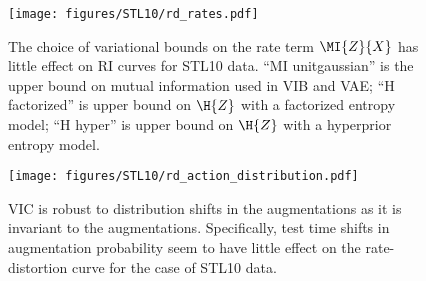 \documentclass[final]{article}
\begin{document}
\begin{figure}[!htb]
    \centering
    \begin{minipage}{.44\textwidth}
        \centering
        \texttt{[image: figures/STL10/rd\_rates.pdf]}
        \caption{The choice of variational bounds on the rate term $\MI{Z}{X}$ has little effect on RI curves for STL10 data.
        ``MI unitgaussian'' is the upper bound on mutual information used in VIB and VAE;
        ``H factorized'' is  upper bound on $\H{Z}$ with a factorized entropy model;
        ``H hyper'' is  upper bound on $\H{Z}$ with a hyperprior entropy model.}
        \label{fig:rate_rd}
    \end{minipage}\hspace{0.1\textwidth}
    \begin{minipage}{0.44\textwidth}
        \centering 
        \texttt{[image: figures/STL10/rd\_action\_distribution.pdf]}
        \caption{VIC is robust to distribution shifts in the augmentations as it is invariant to the augmentations.
        Specifically, test time shifts in augmentation probability seem to have little effect on the rate-distortion curve for the case of STL10 data.}
        \label{fig:action_dist_rd}
    \end{minipage}
\end{figure}
\end{document}
